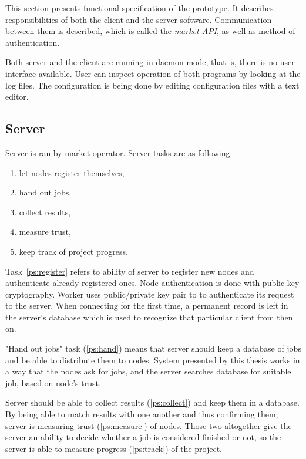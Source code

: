 This section presents functional specification of the prototype. It describes responsibilities of both the client and the server software. Communication between them is described, which is called the \emph{market API}, as well as method of authentication.

Both server and the client are running in daemon mode, that is, there is no user interface available. User can inspect operation of both programs by looking at the log files. The configuration is being done by editing configuration files with a text editor.

\subsection{Server}

Server is ran by market operator. Server tasks are as following:

\begin{enumerate}
	\item \label{ps:register} let nodes register themselves,
	\item \label{ps:hand} hand out jobs,
	\item \label{ps:collect} collect results,
	\item \label{ps:measure} measure trust,
	\item \label{ps:track} keep track of project progress.
\end{enumerate}

Task~\ref{ps:register} refers to ability of server to register new nodes and authenticate already registered ones. Node authentication is done with public-key cryptography. Worker uses public/private key pair to to authenticate its request to the server. When connecting for the first time, a permanent record is left in the server's database which is used to recognize that particular client from then on.

"Hand out jobs" task (\ref{ps:hand}) means that server should keep a database of jobs and be able to distribute them to nodes. System presented by this thesis works in a way that the nodes ask for jobs, and the server searches database for suitable job, based on node's trust.

Server should be able to collect results (\ref{ps:collect}) and keep them in a database. By being able to match results with one another and thus confirming them, server is measuring trust (\ref{ps:measure}) of nodes. Those two altogether give the server an ability to decide whether a job is considered finished or not, so the server is able to measure progress (\ref{ps:track}) of the project.

